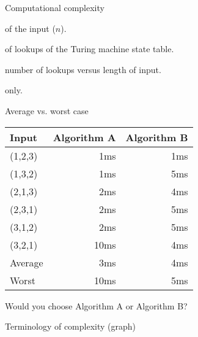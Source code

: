 \begin{frame}{Computational complexity}
  \begin{description}
    \setlength\itemsep{6mm}
    \item[Length] of the input ($n$).
    \item[Number] of lookups of the Turing machine state table.
    \item[Function:] number of lookups versus length of input.
    \item[Worst case] only.
  \end{description}
\end{frame}


\begin{frame}{Average vs. worst case}
  \begin{table}
    \begin{tabular}{p{2cm}rr}
      Input & Algorithm A & \hspace{1cm} Algorithm B \\
      \hline
      (1,2,3) &  1ms &  1ms \\
      (1,3,2) &  1ms &  5ms \\
      (2,1,3) &  2ms &  4ms \\
      (2,3,1) &  2ms &  5ms \\
      (3,1,2) &  2ms &  5ms \\
      (3,2,1) & 10ms &  4ms \\
      \hline
      Average &  3ms &  4ms \\
      Worst   & 10ms &  5ms
    \end{tabular}
  \end{table}
  \begin{center}
    Would you choose Algorithm A or Algorithm B?
  \end{center}
\end{frame}


\begin{frame}[fragile]{Terminology of complexity (graph)}
  \begin{center}
  \end{center}
\end{frame}
  
